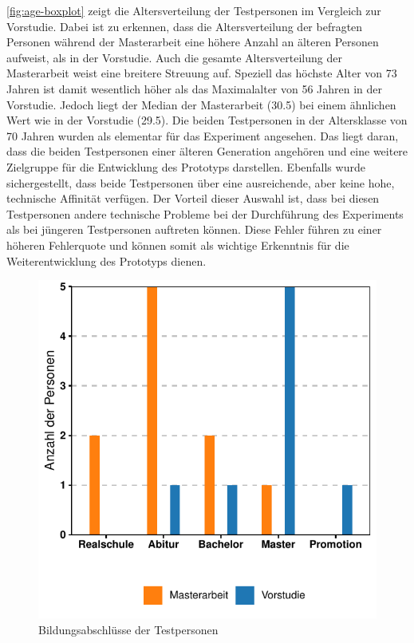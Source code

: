 \autoref{fig:age-boxplot} zeigt die Altersverteilung der Testpersonen im Vergleich zur Vorstudie.
Dabei ist zu erkennen, dass die Altersverteilung der befragten Personen während der Masterarbeit eine höhere Anzahl an älteren Personen aufweist, als in der Vorstudie.
Auch die gesamte Altersverteilung der Masterarbeit weist eine breitere Streuung auf.
Speziell das höchste Alter von 73 Jahren ist damit wesentlich höher als das Maximalalter von 56 Jahren in der Vorstudie.
Jedoch liegt der Median der Masterarbeit (30.5) bei einem ähnlichen Wert wie in der Vorstudie (29.5).
Die beiden Testpersonen in der Altersklasse von 70 Jahren wurden als elementar für das Experiment angesehen.
Das liegt daran, dass die beiden Testpersonen einer älteren Generation angehören und eine weitere Zielgruppe für die Entwicklung des Prototyps darstellen.
Ebenfalls wurde sichergestellt, dass beide Testpersonen über eine ausreichende, aber keine hohe, technische Affinität verfügen.
Der Vorteil dieser Auswahl ist, dass bei diesen Testpersonen andere technische Probleme bei der Durchführung des Experiments als bei jüngeren Testpersonen auftreten können.
Diese Fehler führen zu einer höheren Fehlerquote und können somit als wichtige Erkenntnis für die Weiterentwicklung des Prototyps dienen.\\

\begin{figure}[!ht]
    \centering
    \includegraphics[width=0.7\columnwidth]{figures/education.pdf}
    \caption{\label{fig:education}Bildungsabschlüsse der Testpersonen}
\end{figure}

